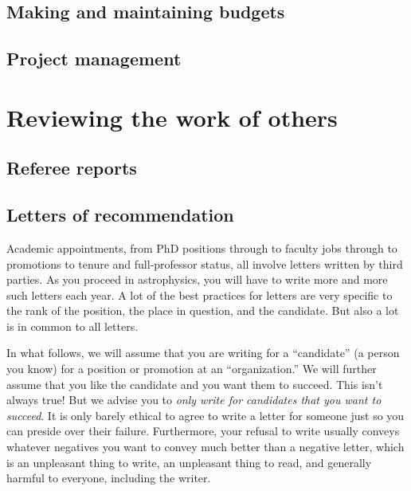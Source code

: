 \documentclass[letterpaper]{book}
\begin{document}
\chapter{Making and maintaining budgets}

\chapter{Project management}

\part{Reviewing the work of others}

\chapter{Referee reports}
\setcounter{page}{351}

\chapter{Letters of recommendation}

Academic appointments, from PhD positions through to faculty jobs through to promotions to tenure and full-professor status, all involve letters written by third parties.
As you proceed in astrophysics, you will have to write more and more such letters each year.
A lot of the best practices for letters are very specific to the rank of the position, the place in question, and the candidate.
But also a lot is in common to all letters.

In what follows, we will assume that you are writing for a ``candidate'' (a person you know) for a position or promotion at an ``organization.''
We will further assume that you like the candidate and you want them to succeed.
This isn't always true!
But we advise you to \emph{only write for candidates that you want to succeed}.
It is only barely ethical to agree to write a letter for someone just so you can preside over their failure.
Furthermore, your refusal to write usually conveys whatever negatives you want to convey much better than a negative letter, which is an unpleasant thing to write, an unpleasant thing to read, and generally harmful to everyone, including the writer.
\end{document}
